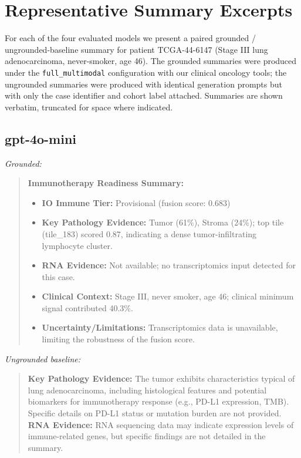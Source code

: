 \documentclass{article}
\theoremstyle{plain}
\begin{document}



\appendix

\section{Representative Summary Excerpts}
\label{app:excerpts}

For each of the four evaluated models we present a paired grounded / ungrounded-baseline summary for patient TCGA-44-6147 (Stage III lung adenocarcinoma, never-smoker, age 46). The grounded summaries were produced under the \texttt{full\_multimodal} configuration with our clinical oncology tools; the ungrounded summaries were produced with identical generation prompts but with only the case identifier and cohort label attached. Summaries are shown verbatim, truncated for space where indicated.

\subsection{gpt-4o-mini}

\noindent\textit{Grounded:}
\begin{quote}\small
\textbf{Immunotherapy Readiness Summary:}
\begin{itemize}
  \item \textbf{IO Immune Tier:} Provisional (fusion score: 0.683)
  \item \textbf{Key Pathology Evidence:} Tumor (61\%), Stroma (24\%); top tile (tile\_183) scored 0.87, indicating a dense tumor-infiltrating lymphocyte cluster.
  \item \textbf{RNA Evidence:} Not available; no transcriptomics input detected for this case.
  \item \textbf{Clinical Context:} Stage III, never smoker, age 46; clinical minimum signal contributed 40.3\%.
  \item \textbf{Uncertainty/Limitations:} Transcriptomics data is unavailable, limiting the robustness of the fusion score.
\end{itemize}
\end{quote}

\noindent\textit{Ungrounded baseline:}
\begin{quote}\small
\textbf{Key Pathology Evidence:} The tumor exhibits characteristics typical of lung adenocarcinoma, including histological features and potential biomarkers for immunotherapy response (e.g., PD-L1 expression, TMB). Specific details on PD-L1 status or mutation burden are not provided. \textbf{RNA Evidence:} RNA sequencing data may indicate expression levels of immune-related genes, but specific findings are not detailed in the summary.
\end{quote}
\end{document}
